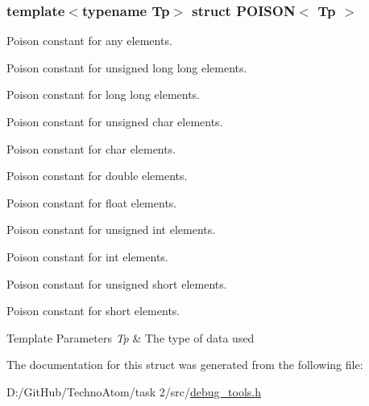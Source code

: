 \subsubsection*{template$<$typename Tp$>$\newline
struct P\+O\+I\+S\+O\+N$<$ Tp $>$}

Poison constant for any elements. 

Poison constant for unsigned long long elements.

Poison constant for long long elements.

Poison constant for unsigned char elements.

Poison constant for char elements.

Poison constant for double elements.

Poison constant for float elements.

Poison constant for unsigned int elements.

Poison constant for int elements.

Poison constant for unsigned short elements.

Poison constant for short elements.


\begin{DoxyTemplParams}{Template Parameters}
{\em Tp} & The type of data used \\
\hline
\end{DoxyTemplParams}


The documentation for this struct was generated from the following file\+:\begin{DoxyCompactItemize}
\item 
D\+:/\+Git\+Hub/\+Techno\+Atom/task 2/src/\hyperlink{debug__tools_8h}{debug\+\_\+tools.\+h}\end{DoxyCompactItemize}
